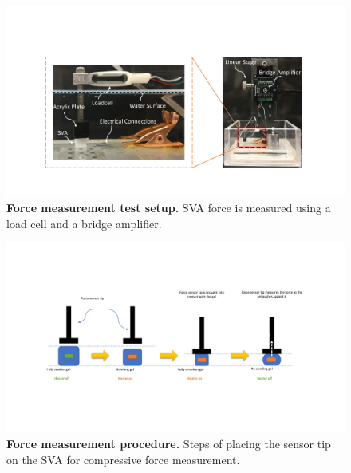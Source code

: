 \begin{figure}[h]
      \centering
      \includegraphics[width=\textwidth]{forceTestSetup.pdf}
      \caption[Force measurement test setup]{\textbf{Force measurement test setup.} SVA force is measured using a load cell and a bridge amplifier.}
      \label{fig:forceTestSetup}
\end{figure}

\begin{figure}[!h]
      \centering
      \includegraphics[width=\textwidth]{forceProcedure.pdf}
      \caption[Force measurement procedure]{\textbf{Force measurement procedure.} Steps of placing the sensor tip on the SVA for compressive force measurement.}
      \label{fig:forceProcedure}
\end{figure}


